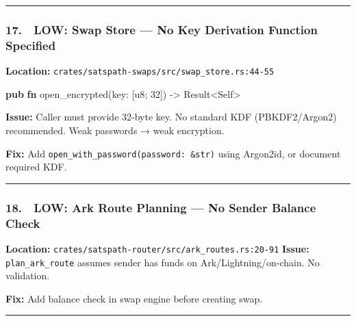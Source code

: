 \documentclass[
]{article}
\newenvironment{Shaded}{}{}
\newcommand{\DataTypeTok}[1]{\textcolor[rgb]{0.56,0.13,0.00}{#1}}
\newcommand{\DecValTok}[1]{\textcolor[rgb]{0.25,0.63,0.44}{#1}}
\newcommand{\KeywordTok}[1]{\textcolor[rgb]{0.00,0.44,0.13}{\textbf{#1}}}
\newcommand{\NormalTok}[1]{#1}
\newcommand{\OperatorTok}[1]{\textcolor[rgb]{0.40,0.40,0.40}{#1}}
\begin{document}
\begin{center}\rule{0.5\linewidth}{0.5pt}\end{center}

\hypertarget{low-swap-store-no-key-derivation-function-specified}{%
\subsubsection{17. 🔵 LOW: Swap Store --- No Key Derivation Function
Specified}\label{low-swap-store-no-key-derivation-function-specified}}

\textbf{Location:}
\texttt{crates/satspath-swaps/src/swap\_store.rs:44-55}

\begin{Shaded}
\begin{Highlighting}[]
\KeywordTok{pub} \KeywordTok{fn}\NormalTok{ open\_encrypted(key}\OperatorTok{:}\NormalTok{ [}\DataTypeTok{u8}\OperatorTok{;} \DecValTok{32}\NormalTok{]) }\OperatorTok{{-}\textgreater{}} \DataTypeTok{Result}\OperatorTok{\textless{}}\DataTypeTok{Self}\OperatorTok{\textgreater{}}
\end{Highlighting}
\end{Shaded}

\textbf{Issue:} Caller must provide 32-byte key. No standard KDF
(PBKDF2/Argon2) recommended. Weak passwords → weak encryption.

\textbf{Fix:} Add \texttt{open\_with\_password(password:\ \&str)} using
Argon2id, or document required KDF.

\begin{center}\rule{0.5\linewidth}{0.5pt}\end{center}

\hypertarget{low-ark-route-planning-no-sender-balance-check}{%
\subsubsection{18. 🔵 LOW: Ark Route Planning --- No Sender Balance
Check}\label{low-ark-route-planning-no-sender-balance-check}}

\textbf{Location:}
\texttt{crates/satspath-router/src/ark\_routes.rs:20-91} \textbf{Issue:}
\texttt{plan\_ark\_route} assumes sender has funds on
Ark/Lightning/on-chain. No validation.

\textbf{Fix:} Add balance check in swap engine before creating swap.

\begin{center}\rule{0.5\linewidth}{0.5pt}\end{center}
\end{document}
